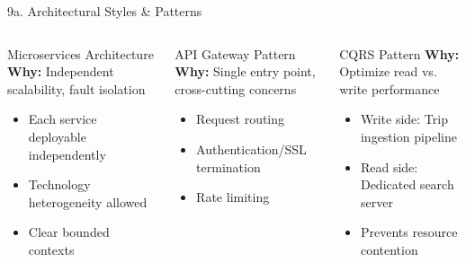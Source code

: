 \documentclass[aspectratio=169, 10pt]{beamer}
\begin{document}
\begin{frame}{9a. Architectural Styles \& Patterns}
    \begin{columns}[T]
        \begin{block}{Microservices Architecture}
            \textbf{Why:} Independent scalability, fault isolation
            \begin{itemize}
                \item Each service deployable independently
                \item Technology heterogeneity allowed
                \item Clear bounded contexts
            \end{itemize}
        \end{block}
        
        \begin{block}{API Gateway Pattern}
            \textbf{Why:} Single entry point, cross-cutting concerns
            \begin{itemize}
                \item Request routing
                \item Authentication/SSL termination
                \item Rate limiting
            \end{itemize}
        \end{block}
      
        
        \begin{block}{CQRS Pattern}
            \textbf{Why:} Optimize read vs. write performance
            \begin{itemize}
                \item Write side: Trip ingestion pipeline
                \item Read side: Dedicated search server
                \item Prevents resource contention
            \end{itemize}
        \end{block}
        
    \end{columns}
\end{frame}
\end{document}
